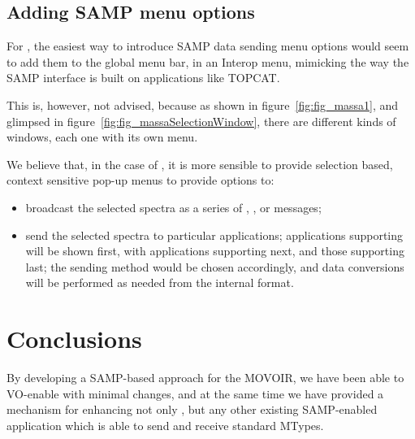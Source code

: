 		\subsection{Adding SAMP menu options} %
		\label{sub:adding_samp_menu_options}
			
			For \massa{}, the easiest way to introduce SAMP
			data sending menu options would seem to add them to
			the global menu bar, in an Interop menu, mimicking
			the way the SAMP interface is built on applications
			like TOPCAT.
			
			This is, however, not advised, because as
			shown in figure~\ref{fig:fig_massa1}, and glimpsed
			in figure~\ref{fig:fig_massaSelectionWindow}, there
			are different kinds of \massa{} windows, each one
			with its own menu.
			
			We believe that, in the case of \massa{}, it is
			more sensible to provide selection based, context
			sensitive pop-up menus to provide options to:
			
				\begin{itemize}
					\item broadcast the selected spectra
					as a series of ,
					, or
					 messages;
					
					\item send the selected spectra to particular
					applications; applications supporting
					 will be
					shown first, with applications supporting
					 next, and those
					supporting  last;
					the sending method would be chosen accordingly,
					and data conversions will be performed as
					needed from the 
					internal format.
				\end{itemize}
			
			
		
	
	\section{Conclusions} %
	\label{sec:movoir_app_conclusions}
		
		By developing a SAMP-based approach for the MOVOIR, we
		have been able to VO-enable \massa{} with minimal
		changes, and at the same time we have provided a mechanism
		for enhancing not only \massa{}, but any other existing
		SAMP-enabled application which is able to send and receive
		standard MTypes.
		

